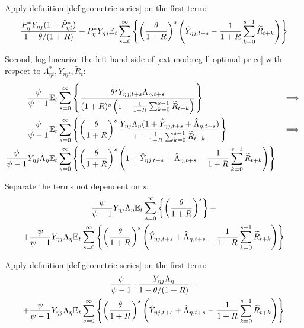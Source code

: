 \documentclass[../thesis.tex]{subfiles}
\begin{document}
Apply definition \ref{def:geometric-series} on the first term:
\begin{align}
	\frac{ P_{\eta}^{\ast} Y_{\eta j} ( 1 + \hat{P}_{\eta t}^{\ast} )}{1-\theta /(1+R)} + P_{\eta}^{\ast} Y_{\eta j} {\mathbb{E}_{t}} \sum_{s=0}^{\infty} \left\{ \left( \frac{\theta}{1 + R} \right)^s \left( \hat{Y}_{\eta j, t+s} - \frac{1}{1 + R} \sum_{k=0}^{s-1} \widetilde{R}_{t+k} \right) \right\} \nonumber
\end{align}

Second, log-linearize the left hand side of \ref{ext-mod:reg-ll-optimal-price} with respect to \( \Lambda_{\eta t}^{\ast}, Y_{\eta j t}, \widetilde{R}_t \):
\begin{alignat}{2}
	\frac{\psi}{\psi-1} &{\mathbb{E}_{t}} \sum_{s=0}^{\infty} \left\{ \frac{\theta^s Y_{\eta j,t+s} \Lambda_{\eta, t+s}}{ (1 + R)^s \left( 1 + \frac{1}{1 + R} \sum_{k=0}^{s-1} \widetilde{R}_{t+k} \right)} \right\} & \implies \nonumber \\
	\frac{\psi}{\psi-1} &{\mathbb{E}_{t}} \sum_{s=0}^{\infty} \left\{ \left( \frac{\theta}{1 + R} \right)^s \frac{ Y_{\eta j} \Lambda_{\eta} (1+ \hat{Y}_{\eta j, t+s} + \hat{\Lambda}_{\eta, t+s})}{ 1 + \frac{1}{1 + R} \sum_{k=0}^{s-1} \widetilde{R}_{t+k}} \right\} & \implies \nonumber \\
	\frac{\psi}{\psi-1} Y_{\eta j} \Lambda_{\eta} &{\mathbb{E}_{t}} \sum_{s=0}^{\infty} \left\{ \left( \frac{\theta}{1 + R} \right)^s \left( 1+ \hat{Y}_{\eta j, t+s} + \hat{\Lambda}_{\eta, t+s} - \frac{1}{1 + R} \sum_{k=0}^{s-1} \widetilde{R}_{t+k} \right) \right\} & \nonumber
\end{alignat}

Separate the terms not dependent on $s$:
\begin{multline}
	\frac{\psi}{\psi-1} Y_{\eta j} \Lambda_{\eta} {\mathbb{E}_{t}} \sum_{s=0}^{\infty} \left\{ \left( \frac{\theta}{1 + R} \right)^s \right\} + 
	\\
	+ \frac{\psi}{\psi-1} Y_{\eta j} \Lambda_{\eta} {\mathbb{E}_{t}} \sum_{s=0}^{\infty} \left\{ \left( \frac{\theta}{1 + R} \right)^s \left( \hat{Y}_{\eta j, t+s} + \hat{\Lambda}_{\eta, t+s} - \frac{1}{1 + R} \sum_{k=0}^{s-1} \widetilde{R}_{t+k} \right) \right\} \nonumber
\end{multline}

Apply definition \ref{def:geometric-series} on the first term:
\begin{multline}
	\frac{\psi}{\psi-1} \cdot \frac{Y_{\eta j} \Lambda_{\eta}}{1-\theta /(1+R)} \, + 
	\\
	+ \frac{\psi}{\psi-1} Y_{\eta j} \Lambda_{\eta} {\mathbb{E}_{t}} \sum_{s=0}^{\infty} \left\{ \left( \frac{\theta}{1 + R} \right)^s \left( \hat{Y}_{\eta j, t+s} + \hat{\Lambda}_{\eta, t+s} - \frac{1}{1 + R} \sum_{k=0}^{s-1} \widetilde{R}_{t+k} \right) \right\} \nonumber
\end{multline}
\end{document}
